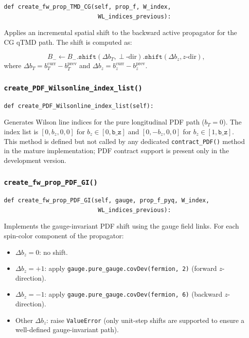 \documentclass[11pt]{article}
\begin{document}
\begin{lstlisting}
def create_fw_prop_TMD_CG(self, prop_f, W_index,
                           WL_indices_previous):
\end{lstlisting}

Applies an incremental spatial shift to the backward active propagator for the CG qTMD path. The shift is computed as:

\begin{equation}
    B_- \leftarrow B_-.\texttt{shift}(\Delta b_T, \perp\text{-dir}).\texttt{shift}(\Delta b_z, z\text{-dir}),
\end{equation}
where $\Delta b_T = b_T^{\text{curr}} - b_T^{\text{prev}}$ and $\Delta b_z = b_z^{\text{curr}} - b_z^{\text{prev}}$.

\subsubsection{\texttt{create\_PDF\_Wilsonline\_index\_list()}}

\begin{lstlisting}
def create_PDF_Wilsonline_index_list(self):
\end{lstlisting}

Generates Wilson line indices for the pure longitudinal PDF path ($b_T = 0$). The index list is $[0, b_z, 0, 0]$ for $b_z \in [0, \texttt{b\_z}]$ and $[0, -b_z, 0, 0]$ for $b_z \in [1, \texttt{b\_z}]$. This method is defined but not called by any dedicated \texttt{contract\_PDF()} method in the mature implementation; PDF contract support is present only in the development version.

\subsubsection{\texttt{create\_fw\_prop\_PDF\_GI()}}

\begin{lstlisting}
def create_fw_prop_PDF_GI(self, gauge, prop_f_pyq, W_index,
                           WL_indices_previous):
\end{lstlisting}

Implements the gauge-invariant PDF shift using the gauge field links. For each spin-color component of the propagator:
\begin{itemize}
    \item $\Delta b_z = 0$: no shift.
    \item $\Delta b_z = +1$: apply \texttt{gauge.pure\_gauge.covDev(fermion, 2)} (forward $z$-direction).
    \item $\Delta b_z = -1$: apply \texttt{gauge.pure\_gauge.covDev(fermion, 6)} (backward $z$-direction).
    \item Other $\Delta b_z$: raise \texttt{ValueError} (only unit-step shifts are supported to ensure a well-defined gauge-invariant path).
\end{itemize}
\end{document}
